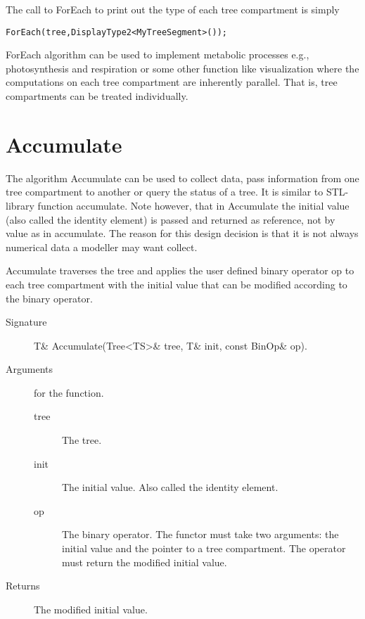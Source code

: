 The call to ForEach to print out the type of each tree compartment is
simply 

\begin{verbatim}
ForEach(tree,DisplayType2<MyTreeSegment>());
\end{verbatim}

ForEach  algorithm can be used to  implement metabolic processes e.g.,
photosynthesis   and respiration     or some  other   function    like
visualization where the computations  on   each tree compartment   are
inherently parallel.  That   is,  tree  compartments can  be   treated
individually.

\section{Accumulate}

The algorithm Accumulate can be used to collect data, pass information
from one tree compartment to another or query the status of a tree. It
is similar to STL-library  function accumulate.  Note however, that in
Accumulate  the initial value  (also called  the identity  element) is
passed and returned as reference,  not by value as in accumulate.  The
reason for  this design  decision is that  it is not  always numerical
data a modeller may want collect.

Accumulate traverses  the tree  and  applies the user  defined  binary
operator op to each  tree compartment with the  initial value that can
be modified according to the binary operator.

\begin{description}
   \item [Signature] T\& Accumulate(Tree<TS>\& tree, T\& init, const BinOp\& op).
   \item [Arguments] for the function.
     \begin{description}
        \item [tree] The tree.
        \item [init] The initial value. Also called the identity
     element.
        \item [op] The binary operator. The functor must take two
     arguments: the initial value and the pointer to a tree compartment. The
     operator must return the modified initial value.
     \end{description} 
   \item[Returns] The  modified initial value.
\end{description} 


